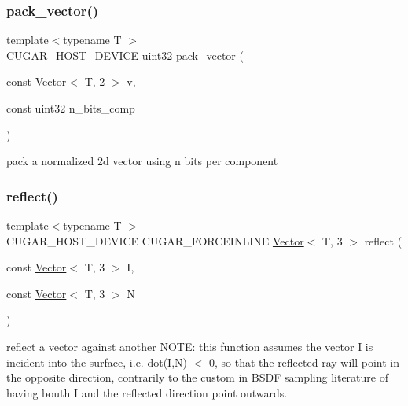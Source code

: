 \subsubsection{\texorpdfstring{pack\+\_\+vector()}{pack\_vector()}}
{\footnotesize\ttfamily template$<$typename T $>$ \\
C\+U\+G\+A\+R\+\_\+\+H\+O\+S\+T\+\_\+\+D\+E\+V\+I\+CE uint32 pack\+\_\+vector (\begin{DoxyParamCaption}\item[{const \hyperlink{structcugar_1_1_vector}{Vector}$<$ T, 2 $>$}]{v,  }\item[{const uint32}]{n\+\_\+bits\+\_\+comp }\end{DoxyParamCaption})\hspace{0.3cm}{\ttfamily [related]}}

pack a normalized 2d vector using n bits per component \mbox{\label{group___vectors_module_ga562d2772848ffc2e393bf70e63e3ae1d}} 
\subsubsection{\texorpdfstring{reflect()}{reflect()}}
{\footnotesize\ttfamily template$<$typename T $>$ \\
C\+U\+G\+A\+R\+\_\+\+H\+O\+S\+T\+\_\+\+D\+E\+V\+I\+CE C\+U\+G\+A\+R\+\_\+\+F\+O\+R\+C\+E\+I\+N\+L\+I\+NE \hyperlink{structcugar_1_1_vector}{Vector}$<$ T, 3 $>$ reflect (\begin{DoxyParamCaption}\item[{const \hyperlink{structcugar_1_1_vector}{Vector}$<$ T, 3 $>$}]{I,  }\item[{const \hyperlink{structcugar_1_1_vector}{Vector}$<$ T, 3 $>$}]{N }\end{DoxyParamCaption})\hspace{0.3cm}{\ttfamily [related]}}

reflect a vector against another N\+O\+TE\+: this function assumes the vector I is incident into the surface, i.\+e. dot(\+I,\+N) $<$ 0, so that the reflected ray will point in the opposite direction, contrarily to the custom in B\+S\+DF sampling literature of having bouth I and the reflected direction point outwards. \mbox{\label{group___vectors_module_ga1ac246c46e1d0dd6b35a69046db3673f}} 
